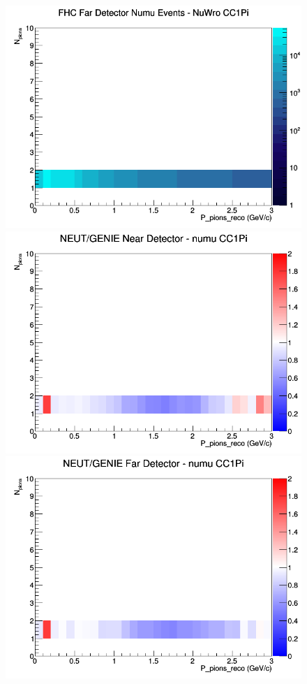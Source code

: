 \documentclass[12pt]{article}
\begin{document}
\begin{figure}[h]
\endminipage
{}
\includegraphics[width=\linewidth]{eff_N_P/LAr/pions/CC1Pi_FHC_FD_numu_N_P_NuWro.png}
\endminipage
\newline
{}
\includegraphics[width=\linewidth]{eff_N_P/LAr/pions/ratios/CC1Pi_NEUT_GENIE_numu_near_N_P.png}
\endminipage
{}
\includegraphics[width=\linewidth]{eff_N_P/LAr/pions/ratios/CC1Pi_NEUT_GENIE_numu_far_N_P.png}

\end{figure}
\end{document}
